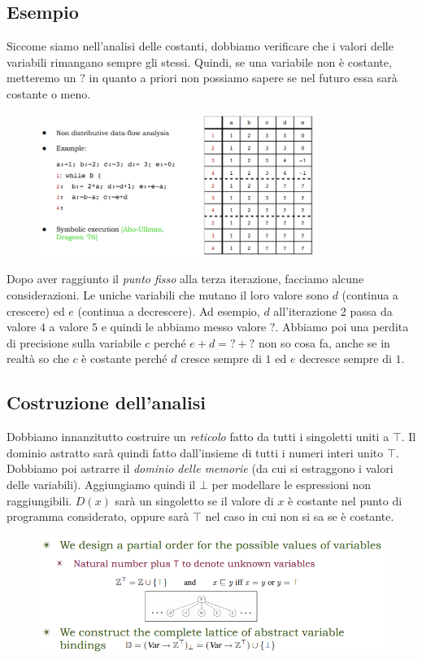 \documentclass[a4paper,oneside,titlepage]{book}
\begin{document}
\subsection{Esempio}
Siccome siamo nell'analisi delle costanti, dobbiamo verificare che i valori delle variabili rimangano sempre gli stessi. Quindi, se una variabile non è costante, metteremo un $?$ in quanto a priori non possiamo sapere se nel futuro essa sarà costante o meno.
\begin{figure}[htp]
	\centering
	\includegraphics[width=0.8\textwidth]{const2.png}
\end{figure}

\noindent
Dopo aver raggiunto il \textit{punto fisso} alla terza iterazione, facciamo alcune considerazioni. Le uniche variabili che mutano il loro valore sono $d$ (continua a crescere) ed $e$ (continua a decrescere). Ad esempio, $d$ all'iterazione 2 passa da valore $4$ a valore $5$ e quindi le abbiamo messo valore $?$. Abbiamo poi una perdita di precisione sulla variabile $c$ perché $e+d=?+?$ non so cosa fa, anche se in realtà so che $c$ è costante perché $d$ cresce sempre di $1$ ed $e$ decresce sempre di $1$.

\subsection{Costruzione dell'analisi}
Dobbiamo innanzitutto costruire un \textit{reticolo} fatto da tutti i singoletti uniti a $\top$. Il dominio astratto sarà quindi fatto dall'insieme di tutti i numeri interi unito $\top$. Dobbiamo poi astrarre il \textit{dominio delle memorie} (da cui si estraggono i valori delle variabili). Aggiungiamo quindi il $\bot$ per modellare le espressioni non raggiungibili. $D(x)$ sarà un singoletto se il valore di $x$ è costante nel punto di programma considerato, oppure sarà $\top$ nel caso in cui non si sa se è costante.
\begin{figure}[htp]
	\centering
	\includegraphics[width=\textwidth, height=\textheight, keepaspectratio]{const3.png}
\end{figure}
\end{document}
